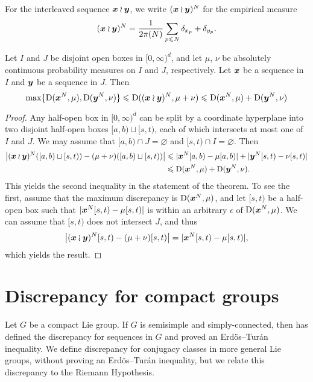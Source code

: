 For the interleaved sequence ${\boldsymbol x}\wr{\boldsymbol y}$, we write $({\boldsymbol x}\wr{\boldsymbol y})^N$ for the 
empirical measure 
\[
	({\boldsymbol x}\wr{\boldsymbol y})^N = \frac{1}{2\pi(N)} \sum_{p\leqslant N} \delta_{x_p} + \delta_{y_p} .
\]

\begin{theorem}\label{thm:wreath-seq}
Let $I$ and $J$ be disjoint open boxes in $[0,\infty)^d$, and let $\mu$, 
$\nu$ be absolutely continuous probability measures on $I$ and $J$, 
respectively. Let ${\boldsymbol x}$ be a sequence in $I$ and ${\boldsymbol y}$ be a sequence in $J$. 
Then 
\[
	\max\{\operatorname{D}({\boldsymbol x}^N,\mu),\operatorname{D}({\boldsymbol y}^N,\nu)\} \leqslant \operatorname{D}(({\boldsymbol x}\wr{\boldsymbol y})^N, \mu+\nu) \leqslant \operatorname{D}({\boldsymbol x}^N,\mu) + \operatorname{D}({\boldsymbol y}^N,\nu)
\]
\end{theorem}
\begin{proof}
Any half-open box in $[0,\infty)^d$ can be split by a coordinate 
hyperplane into two disjoint half-open boxes $[a,b)\sqcup [s,t)$, each of which 
intersects at most one of $I$ and $J$. We may assume that 
$[a,b)\cap J=\varnothing$ and $[s,t)\cap I = \varnothing$. Then 
\begin{align*}
	\left| ({\boldsymbol x}\wr{\boldsymbol y})^N([a,b)\sqcup [s,t)) - (\mu+\nu)([a,b)\sqcup[s,t))\right| 
		&\leqslant |{\boldsymbol x}^N[a,b) - \mu[a,b)| + |{\boldsymbol y}^N[s,t) - \nu[s,t)| \\
		&\leqslant \operatorname{D}({\boldsymbol x}^N,\mu) + \operatorname{D}({\boldsymbol y}^N,\nu) .
\end{align*}
This yields the second inequality in the statement of the theorem. To see the 
first, assume that the maximum discrepancy is $\operatorname{D}({\boldsymbol x}^N,\mu)$, and let 
$[s,t)$ be a half-open box such that $|{\boldsymbol x}^N[s,t) - \mu[s,t)|$ is within an 
arbitrary $\epsilon$ of $\operatorname{D}({\boldsymbol x}^N,\mu)$. We can assume that $[s,t)$ does not 
intersect $J$, and thus 
\[
	\left|({\boldsymbol x}\wr{\boldsymbol y})^N[s,t) - (\mu+\nu)[s,t)\right| = |{\boldsymbol x}^N[s,t) - \mu[s,t)| ,
\]
which yields the result. 
\end{proof}





\section{Discrepancy for compact groups}

Let $G$ be a compact Lie group. If $G$ is semisimple and simply-connected, then 
\cite{rosengarten-2013} has defined the discrepancy for sequences in $G$ and 
proved an Erd\"os--Tur\'an inequality. We define discrepancy for conjugacy 
classes in more general Lie groups, without proving an Erd\"os--Tur\'an 
inequality, but we relate this discrepancy to the Riemann Hypothesis. 
